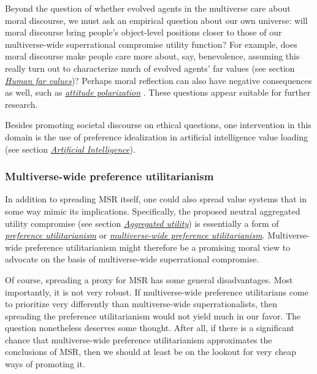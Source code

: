 Beyond the question of whether evolved agents in the multiverse care
about moral discourse, we must ask an empirical question about our own
universe: will moral discourse bring people's object-level positions
closer to those of our multiverse-wide superrational compromise utility
function? For example, does moral discourse make people care more about,
say, benevolence, assuming this really turn out to characterize much of
evolved agents' far values (see section
\protect\hyperlink{human-far-values}{\emph{Human far values}})?
Perhaps moral reflection can also have negative consequences as well,
such as
\href{https://en.wikipedia.org/wiki/Group_polarization\#Attitude_polarization}{\emph{attitude
polarization}} \parencite{Lord1979-sc,Taber2006-ew}. These
questions appear suitable for further research.

Besides promoting societal discourse on ethical questions, one
intervention in this domain is the use of preference idealization in
artificial intelligence value loading (see section
\protect\hyperlink{artificial-intelligence}{\emph{Artificial
Intelligence}}).

\hypertarget{multiverse-wide-preference-utilitarianism}{\subsubsection{Multiverse-wide
preference
utilitarianism}\label{multiverse-wide-preference-utilitarianism}}

In addition to spreading MSR itself, one could also spread value systems
that in some way mimic its implications. Specifically, the proposed
neutral aggregated utility compromise (see section
\protect\hyperlink{_2uwv44pwn55u}{\emph{Aggregated utility}}) is
essentially a form of
\href{https://foundational-research.org/hedonistic-vs-preference-utilitarianism/}{\emph{preference
utilitarianism}} or
\href{http://lesswrong.com/lw/jll/multiversewide_preference_utilitarianism/}{\emph{multiverse-wide
preference utilitarianism}}. Multiverse-wide preference utilitarianism
might therefore be a promising moral view to advocate on the basis of
multiverse-wide superrational compromise.

Of course, spreading a proxy for MSR has some general disadvantages.
Most importantly, it is not very robust. If multiverse-wide preference
utilitarians come to prioritize very differently than multiverse-wide
superrationalists, then spreading the preference utilitarianism would
not yield much in our favor. The question nonetheless deserves some
thought. After all, if there is a significant chance that
multiverse-wide preference utilitarianism approximates the conclusions
of MSR, then we should at least be on the lookout for very cheap ways of
promoting it.

